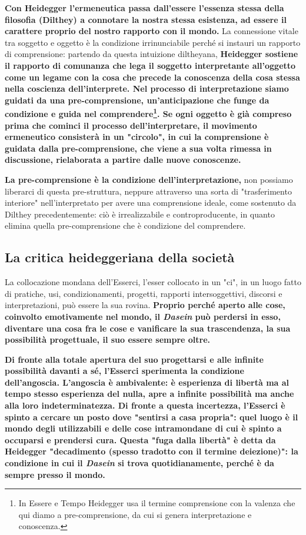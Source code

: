 \textbf{Con Heidegger l'ermeneutica passa dall'essere
l'essenza stessa della filosofia (Dilthey) a
connotare la nostra stessa esistenza, ad essere
il carattere proprio del nostro rapporto con il
mondo.}
La connessione vitale tra soggetto e oggetto è la
condizione irrinunciabile perché si instauri un
rapporto di comprensione: partendo da questa
intuizione diltheyana,\textbf{ Heidegger sostiene 
il rapporto di comunanza che lega
il soggetto interpretante all'oggetto come
un legame con la cosa che precede la
conoscenza della cosa stessa nella coscienza
dell'interprete. Nel processo di interpretazione
siamo guidati da una pre-comprensione,
un'anticipazione che funge da condizione e guida
nel comprendere\footnote{In Essere e Tempo Heidegger usa il termine comprensione con la valenza che qui diamo a pre-comprensione, da cui si genera interpretazione e conoscenza.}.
Se ogni oggetto è già compreso prima che cominci il
processo dell'interpretare, il movimento ermeneutico
consisterà in un "circolo", in cui la comprensione
è guidata dalla pre-comprensione, che viene
a sua volta rimessa in discussione, rielaborata
a partire dalle nuove conoscenze.}

\textbf{La pre-comprensione è la condizione dell'interpretazione,}
non possiamo liberarci di questa pre-struttura, neppure
attraverso una sorta di  "trasferimento interiore"
nell'interpretato per avere una comprensione
ideale, come sostenuto da Dilthey precedentemente:
ciò è irrealizzabile e controproducente, in
quanto elimina quella pre-comprensione che è
condizione del comprendere.

\subsection{La critica heideggeriana della società}

La collocazione mondana dell'Esserci, l'esser collocato
in un "ci", in un luogo fatto di pratiche,
usi, condizionamenti, progetti, rapporti intersoggettivi,
discorsi e interpretazioni, può essere la sua rovina.
\textbf{Proprio perché aperto alle cose, coinvolto
emotivamente nel mondo, il \textit{Dasein} può
perdersi in esso, diventare una cosa fra le cose e
vanificare la sua trascendenza, la sua possibilità
progettuale, il suo essere sempre oltre.}

\textbf{Di fronte alla totale apertura del suo progettarsi e
alle infinite possibilità davanti a sé, l'Esserci sperimenta
la condizione dell'angoscia. L'angoscia è ambivalente:
è esperienza di libertà ma al tempo stesso esperienza del
nulla, apre a infinite possibilità ma anche alla loro
indeterminatezza. Di fronte a questa incertezza,
l'Esserci è spinto a cercare un posto dove "sentirsi
a casa propria": quel luogo è il mondo degli
utilizzabili e delle cose intramondane di cui è
spinto a occuparsi e prendersi cura.
Questa "fuga dalla libertà" è detta da Heidegger
"decadimento (spesso tradotto con il termine deiezione)":
la condizione in cui il \textit{Dasein} si trova quotidianamente, perché è da sempre presso il mondo.} 

